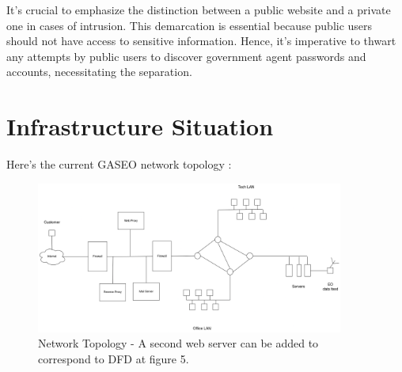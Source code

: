 \documentclass[12pt]{article}
\begin{document}
It's crucial to emphasize the distinction between a public website and a private one in cases of intrusion. This demarcation is essential because public users should not have access to sensitive information. Hence, it's imperative to thwart any attempts by public users to discover government agent passwords and accounts, necessitating the separation.

\newpage

\section{Infrastructure Situation}\label{Sec: Infrastructure}

Here's the current GASEO network topology : 


\begin{figure}[h]
    \centering
    \includegraphics[width=0.9\textwidth]{Figures/Infrastructure/Topology_1.png}
    \caption{Network Topology - A second web server can be added to correspond to DFD at figure 5.}
\end{figure}
\end{document}
